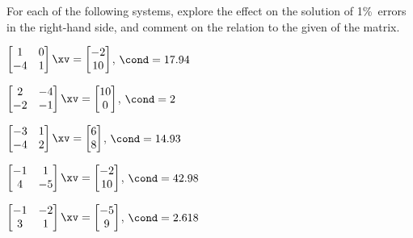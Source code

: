 \begin{exercise}  
For each of the following systems, explore the effect on the solution of 1\%~errors in the right-hand side, and comment on the relation to the given  of the matrix.

\begin{Parts}
\begin{OmitV1}
\item \(\begin{bmatrix} 1&0
\\-4&1 \end{bmatrix}\xv
=\begin{bmatrix} -2
\\10 \end{bmatrix}\), 
\(\cond=17.94\)
\end{OmitV1}

\item \(\begin{bmatrix} 2&-4
\\-2&-1 \end{bmatrix}\xv
=\begin{bmatrix} 10
\\0 \end{bmatrix}\), 
\(\cond=2\)

\item \(\begin{bmatrix} -3&1
\\-4&2 \end{bmatrix}\xv
=\begin{bmatrix} 6\\8 \end{bmatrix}\), 
\(\cond=14.93\)

\item \(\begin{bmatrix} -1&1
\\4&-5 \end{bmatrix}\xv
=\begin{bmatrix} -2
\\10 \end{bmatrix}\), 
\(\cond=42.98\)

\begin{OmitV1}
\item \(\begin{bmatrix} -1&-2
\\3&1 \end{bmatrix}\xv
=\begin{bmatrix} -5
\\9 \end{bmatrix}\), 
\(\cond=2.618\)
\end{OmitV1}

\end{Parts}
\end{exercise}




